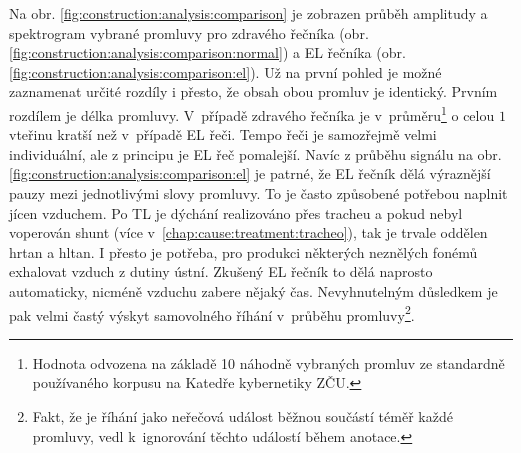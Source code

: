 Na obr. \ref{fig:construction:analysis:comparison} je zobrazen průběh amplitudy a spektrogram vybrané promluvy pro zdravého řečníka (obr. \ref{fig:construction:analysis:comparison:normal}) a EL řečníka (obr. \ref{fig:construction:analysis:comparison:el}).
Už na první pohled je možné zaznamenat určité rozdíly i přesto, že obsah obou promluv je identický.
Prvním rozdílem je délka promluvy.
V~případě zdravého řečníka je v~průměru\footnote{Hodnota odvozena na základě 10 náhodně vybraných promluv ze standardně používaného korpusu na Katedře kybernetiky ZČU.} o celou $1$ vteřinu kratší než v~případě EL řeči.
Tempo řeči je samozřejmě velmi individuální, ale z principu je EL řeč pomalejší.
Navíc z průběhu signálu na obr. \ref{fig:construction:analysis:comparison:el} je patrné, že EL řečník dělá výraznější pauzy mezi jednotlivými slovy promluvy.
To je často způsobené potřebou naplnit jícen vzduchem.
Po TL je dýchání realizováno přes tracheu a pokud nebyl voperován shunt (více v~\ref{chap:cause:treatment:tracheo}), tak je trvale oddělen hrtan a hltan.
I přesto je potřeba, pro produkci některých neznělých fonémů exhalovat vzduch z dutiny ústní.
Zkušený EL řečník to dělá naprosto automaticky, nicméně  vzduchu zabere nějaký čas.
Nevyhnutelným důsledkem je pak velmi častý výskyt samovolného říhání v~průběhu promluvy\footnote{Fakt, že je říhání jako neřečová událost běžnou součástí téměř každé promluvy, vedl  k~ignorování těchto událostí během anotace.}.

